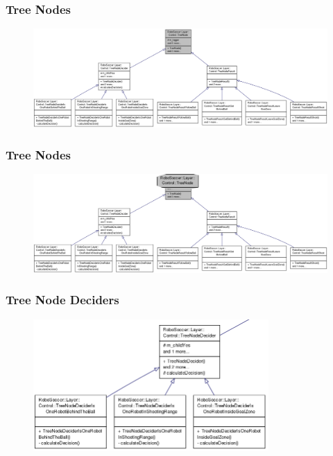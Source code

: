 \documentclass[hyperref={pdfpagelabels=false},compress]{beamer}
\begin{document}
\begin{frame}
	\frametitle{Tree Nodes}
	\center
	\begin{figure}
		\centering
		\includegraphics[width = \textwidth]{inheritance_graph_treenode.png}
	\end{figure}
\end{frame}

\begin{frame}
	\frametitle{Tree Nodes}
	\center
	\begin{figure}
		\centering
		\includegraphics[width = \textwidth]{inheritance_graph_treenode_zoomed.png}
	\end{figure}
\end{frame}

\begin{frame}
	\frametitle{Tree Node Deciders}
	\center
	\begin{figure}
		\centering
		\includegraphics[width = 0.8\textwidth]{inheritance_graph_treenode_deciders.png}
	\end{figure}
\end{frame}
\end{document}
